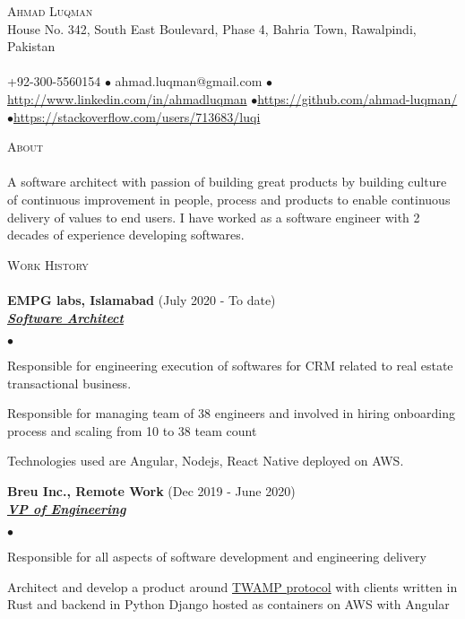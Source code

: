 \documentclass{article}
\newcommand{\lineunder}{\vspace*{-8pt} \\ \hspace*{-18pt} \hrulefill \\}
\newcommand{\header}[1]{{\hspace*{-15pt}\vspace*{6pt} \textsc{#1}} \vspace*{-6pt} \lineunder}
\newcommand{\employer}[3]{{ \textbf{#1} (#2)\\ \underline{\textbf{\emph{#3}}}\\  }}
\newcommand{\contact}[3]{
\vspace*{-8pt}
\begin{center}
{\LARGE \scshape {#1}}\\
#2 \lineunder 
#3
\end{center}
\vspace*{-8pt}
}
\newenvironment{achievements}{\begin{list}{$\bullet$}{\topsep 0pt \itemsep -2pt}}{\vspace*{4pt}\end{list}}
\begin{document}
\small
\smallskip
\vspace*{-44pt}

\contact{Ahmad Luqman}
{House No. 342, South East Boulevard, Phase 4, Bahria Town, Rawalpindi, Pakistan}
{+92-300-5560154 $\bullet$ ahmad.luqman@gmail.com  $\bullet$\url{http://www.linkedin.com/in/ahmadluqman} $\bullet$\url{https://github.com/ahmad-luqman/} $\bullet$\url{https://stackoverflow.com/users/713683/luqi}}

\header{About}
A software architect with passion of building great products by building culture of continuous improvement in people, process and products to enable continuous delivery of values to end users. I have worked as a software engineer with 2 decades of experience developing softwares.
\vspace*{6pt}

\header{Work History}
\employer{EMPG labs, Islamabad}{July 2020 - To date}{Software Architect}
    \begin{achievements}
    \item Responsible for engineering execution of softwares for CRM related to real estate transactional business.
    \item Responsible for managing team of 38 engineers and involved in hiring onboarding process and scaling from 10 to 38 team count
    \item Technologies used are Angular, Nodejs, React Native deployed on AWS.
    \end{achievements}

\employer{Breu Inc., Remote Work}{Dec 2019 - June 2020}{VP of Engineering}
	\begin{achievements}
	\item Responsible for all aspects of software development and engineering delivery
	\item Architect and develop a product around \href{https://tools.ietf.org/html/rfc5357}{TWAMP protocol} with clients written in Rust and backend in Python Django hosted as containers on AWS with Angular 
	\end{achievements}
\end{document}

